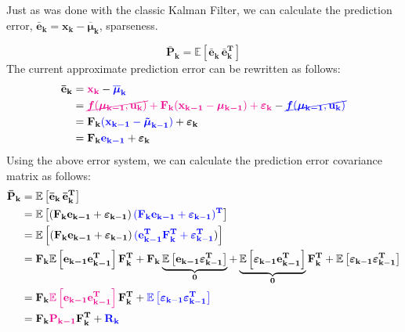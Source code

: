 \documentclass[12pt]{article}
\newcommand{\bvec}[1]{\boldsymbol{\mathbf{#1}}} %
\newcommand{\bvecT}[1]{\boldsymbol{\mathbf{#1^T}}} %
\newcommand{\mat}[1]{\boldsymbol{\mathbf{#1}}}
\newcommand{\matT}[1]{\boldsymbol{\mathbf{#1^T}}}
\newcommand{\brac}[1]{\left[#1\right]} %
\newcommand{\mb}[1]{{\boldsymbol{#1}}} %
\newcommand{\expv}[1]{\mathbb{E}\brac{#1}} %
\newcommand{\blue}[1]{\color{blue}#1\color{black}}
\newcommand{\magenta}[1]{\color{magenta}#1\color{black}}
\begin{document}
Just as was done with the classic Kalman Filter, we can calculate the prediction
 error, $\bvec{\bar{e}_k} = \bvec{x_k} - \bvec{\overline{\mu}_k}$, sparseness.

\begin{equation}
\mat{\bar{P}_k} = \expv{\bvec{\bar{e}_k}\, \bvecT{\bar{e}_k}}    
\end{equation}
The current approximate prediction error can be rewritten as follows:
\begin{equation}
    \begin{aligned}
        \bvec{\bar{e}_k} &= \magenta{\bvec{x_k}} - \blue{\bvec{\overline{\mu}_k}}\\
        &= \magenta{\cancel{\mb{f}(\bvec{\mu_{k-1}}, \bvec{u_k})} + \mat{F_k} 
        (\bvec{x_{k-1}} - \bvec{\mu_{k-1}}) + \bvec{\varepsilon_k}} - 
        \blue{\cancel{\mb{f}(\bvec{\mu_{k-1}}, \bvec{u_k})}}\\
        &= \mat{F_k} \blue{(\bvec{x_{k-1}} - \mb{\tilde\mu}_\mathbf{k-1})} + \mb{\varepsilon}_\mathbf{k}\\
        &= \mat{F_k}\blue{\bvec{e_{k-1}}} + \mb{\varepsilon}_\mathbf{k}
    \end{aligned}
\end{equation}
Using the above error system, we can calculate the prediction error covariance matrix as follows:
\begin{equation}
    \begin{aligned}
        \mat{\bar{P}_k} &= \expv{\bvec{\bar{e}_k}\, \bvecT{\bar{e}_k}}\\
        &= \expv{(\mat{F_k}\bvec{e_{k-1}} + \mb{\varepsilon}_\mathbf{k-1}) \, 
        \blue{(\mat{F_k}\bvec{e_{k-1}} + 
        \mb{\varepsilon}_\mathbf{k-1})^\mathbf{T}}}\\
        &= \expv{(\mat{F_k}\bvec{e_{k-1}} + \mb{\varepsilon}_\mathbf{k-1}) \, \blue{(\bvecT{e_{k-1}}\matT{F_k} + \mb{\varepsilon}_\mathbf{k-1}^\mathbf{T}})}\\
        &= \mat{F_k}\expv{\bvec{e_{k-1}} \bvecT{e_{k-1}}}\matT{F_k} + \mat{F_k} \underbrace{\expv{ \bvec{e_{k-1}} \mb{\varepsilon}_\mathbf{k-1}^\mathbf{T} }}_{\mat{0}} + \underbrace{\expv{\mb{\varepsilon}_\mathbf{k-1} \bvecT{e_{k-1}}}}_{\mat{0}} \matT{F_{k}} + \expv{\mb{\varepsilon}_\mathbf{k-1} \mb{\varepsilon}_\mathbf{k-1}^\mathbf{T}}\\
        &= \mat{F_k}\magenta{\expv{\bvec{e_{k-1}} \bvecT{e_{k-1}}}}\matT{F_k} + \blue{\expv{\mb{\varepsilon}_\mathbf{k-1} \mb{\varepsilon}_\mathbf{k-1}^\mathbf{T}}}\\
        &= \mat{F_k}\magenta{ \mat{P_{k-1}} } \matT{F_k} + \blue{\mat{R_k}}
    \end{aligned}
    \label{eq:ekf-prediction-error-covariance}
\end{equation}
\end{document}
